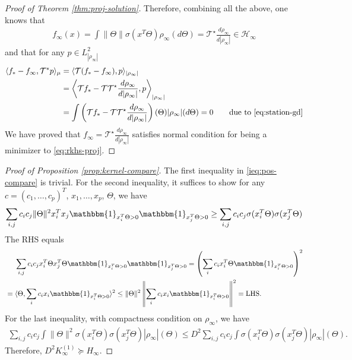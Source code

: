 \documentclass[11pt]{article}
\numberwithin{equation}{section}
\begin{document}
\begin{proof}[Proof of Theorem \ref{thm:proj-solution}]
    Therefore, combining all the above, one knows that
    \begin{align*}
        f_{\infty}(x) = \int \|\Theta\|\sigma(x^T\Theta)\rho_{\infty}(d\Theta)= \mathcal{T}^\star\frac{d\rho_{\infty}}{d|\rho_\infty|} \in \mathcal{H}_\infty
    \end{align*}
    and that for any $p\in L^2_{|\rho_\infty|}$
    \begin{align}
        \langle f_* - f_{\infty}, \mathcal{T}^* p \rangle_{\mu}  &= \langle \mathcal{T} (f_* - f_{\infty}),  p \rangle_{|\rho_\infty|} \\
        & = \left\langle \mathcal{T} f_* - \mathcal{T}\mathcal{T}^\star \frac{d\rho_{\infty}}{d|\rho_{\infty}|}, p \right\rangle_{|\rho_\infty|} \\
        & = \int \left(\mathcal{T} f_* - \mathcal{T}\mathcal{T}^\star \frac{d\rho_{\infty}}{d|\rho_{\infty}|} \right) (\Theta) |\rho_{\infty}|(d\Theta) =0 \quad \quad \text{due to \eqref{eq:station-gd}}
    \end{align}
 We have proved that $f_\infty = \mathcal{T}^\star\frac{d\rho_{\infty}}{d|\rho_\infty|}$ satisfies normal condition for being a minimizer to \eqref{eq:rkhs-proj}.
    \end{proof}






\begin{proof}[Proof of Proposition \ref{prop:kernel-compare}]

    The first inequality in \eqref{ieq:pos-compare} is trivial. For the second inequality, it suffices to show for any $c = (c_1,\dots,c_p)^T$, $x_1,\dots,x_p$, $\Theta$, we have
    \begin{align}
         \sum_{i,j} c_ic_j\|\Theta\|^2x_i^Tx_j\mathbbm{1}_{x_i^T \Theta > 0} \mathbbm{1}_{x_j^T \Theta > 0}  \geq \sum_{i,j}c_ic_j\sigma(x_i^T\Theta)\sigma(x_j^T\Theta)
    \end{align}
    The RHS equals
    \begin{align}
    &\quad\,\,\sum_{i,j}c_ic_jx_i^T\Theta x_j^T\Theta \mathbbm{1}_{x_i^T \Theta > 0} \mathbbm{1}_{x_j^T \Theta > 0} = \left( \sum_i c_i x_i^T\Theta \mathbbm{1}_{x_i^T \Theta > 0}\right)^2 \\
    &= \langle \Theta, \sum_i c_ix_i \mathbbm{1}_{x_i^T \Theta > 0}\rangle^2 \leq \|\Theta\|^2 \left\|\sum_ic_i x_i\mathbbm{1}_{x_i^T \Theta > 0}\right\|^2 = \text{LHS}.
    \end{align}
    For the last inequality, with compactness condition on $\rho_\infty$, we have
    \begin{align}
    \sum_{i,j}c_ic_j\int \|\Theta\|^2 \sigma(x_i^T\Theta)\sigma(x_j^T\Theta) |\rho_{\infty}|(\Theta)\leq D^2\sum_{i,j}c_ic_j \int \sigma(x_i^T\Theta)\sigma(x_j^T\Theta)|\rho_{\infty}|(\Theta).
    \end{align}
    Therefore, $D^2K_\infty^{(1)} \succeq H_\infty$.
    
\end{proof}
\end{document}
